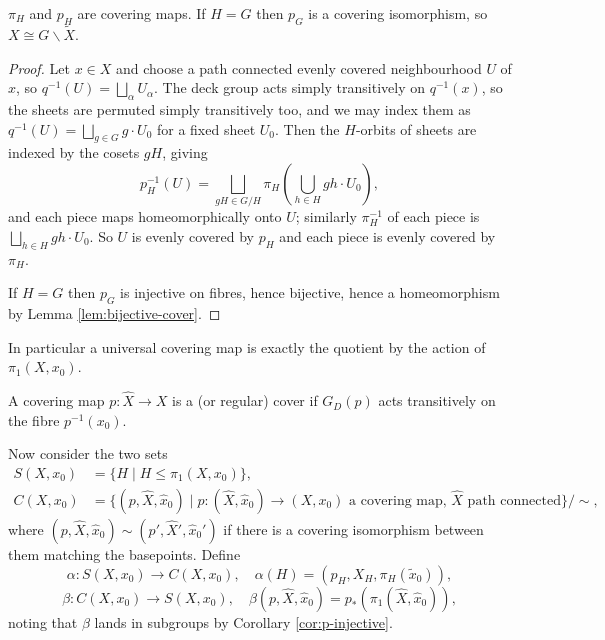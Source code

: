 \documentclass[a4paper]{scrartcl}
\begin{document}
\begin{proposition} \label{prop:quotient-cover}
	$\pi_H$ and $p_H$ are covering maps. If $H = G$ then $p_G$ is a covering isomorphism, so $X \cong G\backslash\widetilde X$.
\end{proposition}
\begin{proof}
	Let $x \in X$ and choose a path connected evenly covered neighbourhood $U$ of $x$, so $q^{-1}(U) = \bigsqcup_\alpha U_\alpha$. The deck group acts simply transitively on $q^{-1}(x)$, so the sheets are permuted simply transitively too, and we may index them as $q^{-1}(U) = \bigsqcup_{g \in G} g \cdot U_0$ for a fixed sheet $U_0$. Then the $H$-orbits of sheets are indexed by the cosets $gH$, giving
	$$
	p_H^{-1}(U) = \bigsqcup_{gH \in G/H} \pi_H\!\left(\textstyle\bigcup_{h\in H} gh\cdot U_0\right),
	$$
	and each piece maps homeomorphically onto $U$; similarly $\pi_H^{-1}$ of each piece is $\bigsqcup_{h \in H} gh \cdot U_0$. So $U$ is evenly covered by $p_H$ and each piece is evenly covered by $\pi_H$.

	If $H = G$ then $p_G$ is injective on fibres, hence bijective, hence a homeomorphism by Lemma \ref{lem:bijective-cover}.
\end{proof}

In particular a universal covering map is exactly the quotient by the action of
$\pi_1(X, x_0)$.

\begin{definition}
	A covering map $p: \hat X \to X$ is a  (or regular) cover if $G_D(p)$ acts transitively on the fibre $p^{-1}(x_0)$.
\end{definition}

Now consider the two sets
\begin{align*}
	S(X, x_0) &= \{H \mid H \leq \pi_1(X,x_0)\}, \\
	C(X, x_0) &= \{(p, \hat X, \hat x_0) \mid p: (\hat X, \hat x_0) \to (X,x_0) \text{ a covering map, } \hat X \text{ path connected}\}/\!\sim,
\end{align*}
where $(p, \hat X, \hat x_0) \sim (p', \hat X', \hat x_0')$ if there is a covering
isomorphism between them matching the basepoints. Define
$$
\alpha: S(X,x_0) \to C(X,x_0), \quad \alpha(H) = (p_H, X_H, \pi_H(\tilde x_0)),
$$
$$
\beta: C(X,x_0) \to S(X,x_0), \quad \beta(p, \hat X, \hat x_0) = p_*(\pi_1(\hat X, \hat x_0)),
$$
noting that $\beta$ lands in subgroups by Corollary \ref{cor:p-injective}.
\end{document}
